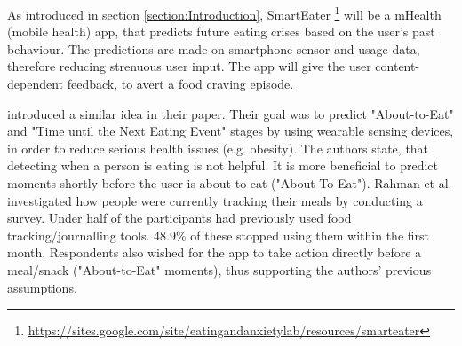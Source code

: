 
As introduced in section \ref{section:Introduction}, SmartEater \footnote{\url{https://sites.google.com/site/eatingandanxietylab/resources/smarteater}} will be a mHealth (mobile health) app, that predicts future eating crises based on the user's past behaviour. The predictions are made on smartphone sensor and usage data, therefore reducing strenuous user input. The app will give the user content-dependent feedback, to avert a food craving episode. 


\textcite{AboutToEat2016Rahman} introduced a similar idea in their paper. Their goal was to predict "About-to-Eat" and "Time until the Next Eating Event" stages by using wearable sensing devices, in order to reduce serious health issues (e.g. obesity). The authors state, that detecting when a person is eating is not helpful. It is more beneficial to predict moments shortly before the user is about to eat ("About-To-Eat").
Rahman et al. investigated how people were currently tracking their meals by conducting a survey. Under half of the participants had previously used food tracking/journalling tools. 48.9\% of these stopped using them within the first month. Respondents also  wished for the app to take action directly before a meal/snack ("About-to-Eat" moments), thus supporting the authors' previous assumptions.

